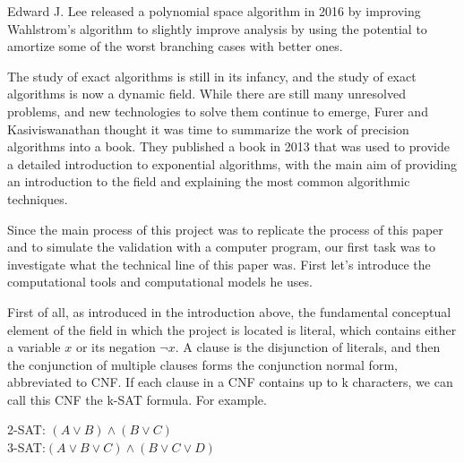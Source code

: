 \documentclass{sigchi}
\begin{document}
Edward J. Lee released a polynomial space algorithm in 2016
\cite{Lee} by improving Wahlstrom's algorithm to slightly improve analysis by using the potential to amortize some of the worst branching cases with better ones. 

The study of exact algorithms is still in its infancy, and the study of exact algorithms is now a dynamic field. While there are still many unresolved problems, and new technologies to solve them continue to emerge, Furer and Kasiviswanathan thought it was time to summarize the work of precision algorithms into a book. They published a book in 2013 that was used to provide a detailed introduction to exponential algorithms, with the main aim of providing an introduction to the field and explaining the most common algorithmic techniques.\cite{10.1145/2428556.2428575}

Since the main process of this project was to replicate the process of this paper and to simulate the validation with a computer program, our first task was to investigate what the technical line of this paper was. First let's introduce the computational tools and computational models he uses.

First of all, as introduced in the introduction above, the fundamental conceptual element of the field in which the project is located is literal, which contains either a variable $x$ or its negation $\neg x$. A clause is the disjunction of literals, and then the conjunction of multiple clauses forms the conjunction normal form, abbreviated to CNF. If each clause in a CNF contains up to k characters, we can call this CNF the k-SAT formula. For example.
\begin{center}
2-SAT:  $\left ( A \vee B \right )\wedge \left ( B \vee C \right ) $\\3-SAT:$\left ( A \vee B\vee C \right )\wedge \left ( B \vee C\vee D \right )$
\end{center}
\end{document}
